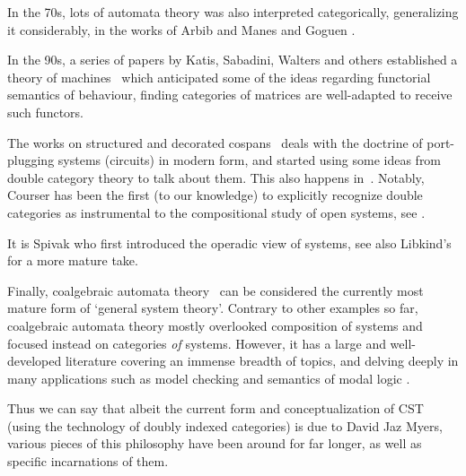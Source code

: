 In the 70s, lots of automata theory was also interpreted categorically, generalizing it considerably, in the works of Arbib and Manes \cite{arbibRelevanceAbstractAlgebra1969,arbibMachinesCategoryExpository1974,arbibFoundationsSystemTheory1974,arbibAdjointMachinesStatebehavior1975} and Goguen \cite{goguenRealizationUniversal1972,goguenMinimalRealizationMachines1972,goguenCategoricalFoundationsGeneral1973}.

In the 90s, a series of papers by Katis, Sabadini, Walters and others established a theory of machines~\cite{sabadini_functions_1993, bloom_matrices_1996, katis1997bicategories, katis1997span, katis_algebra_1999, katis2002feedback} which anticipated some of the ideas regarding functorial semantics of behaviour, finding categories of matrices are well-adapted to receive such functors.

The works on structured and decorated cospans~\cite{fiadeiro2007structured,fong2015decorated, baez2020open,baez2020structured,Baez2022structuredversus} deals with the doctrine of port-plugging systems (circuits) in modern form, and started using some ideas from double category theory to talk about them.
This also happens in~\cite{lerman2018networks,culbertson2020formal}.
Notably, Courser has been the first (to our knowledge) to explicitly recognize double categories as instrumental to the compositional study of open systems, see \cite{courserOpenSystemsDouble2020}.

It is Spivak \cite{spivak2013operad} who first introduced the operadic view of systems, see also Libkind's \cite{libkind2021operadic} for a more mature take.

Finally, coalgebraic automata theory~\cite{goos_relational_1977,rutten_universal_2000,kupke_coalgebraic_2008,jacobs_introduction_2017} can be considered the currently most mature form of `general system theory'.
Contrary to other examples so far, coalgebraic automata theory mostly overlooked composition of systems and focused instead on categories \emph{of} systems.
However, it has a large and well-developed literature covering an immense breadth of topics, and delving deeply in many applications such as model checking and semantics of modal logic \cite{mossCoalgebraicLogic1999}.

Thus we can say that albeit the current form and conceptualization of CST (using the technology of doubly indexed categories) is due to David Jaz Myers, various pieces of this philosophy have been around for far longer, as well as specific incarnations of them.

